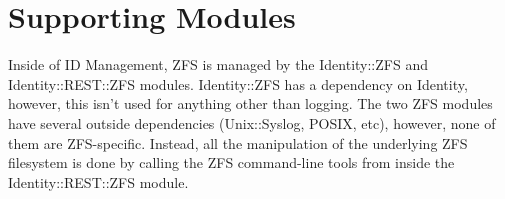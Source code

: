 \section{Supporting Modules}

Inside of ID Management, ZFS is managed by the Identity::ZFS and Identity::REST::ZFS modules. Identity::ZFS has a dependency on Identity, however, this isn't used for anything other than logging. The two ZFS modules have several outside dependencies (Unix::Syslog, POSIX, etc), however, none of them are ZFS-specific. Instead, all the manipulation of the underlying ZFS filesystem is done by calling the ZFS command-line tools from inside the Identity::REST::ZFS module.
